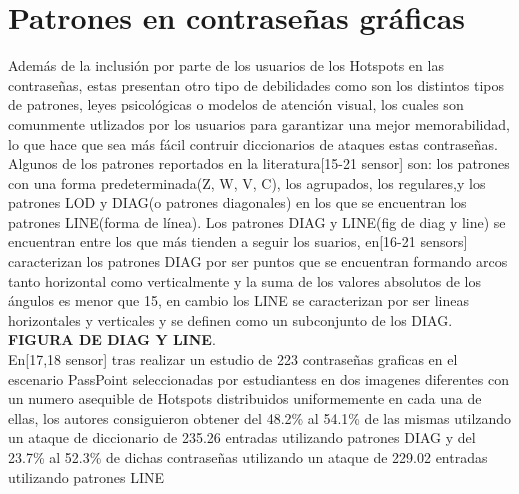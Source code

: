 \documentclass[12pt]{report}
\begin{document}
\section{Patrones en contraseñas gráficas}
Además de la inclusión por parte de los usuarios de los Hotspots en las contraseñas, estas presentan otro tipo de debilidades como son los distintos tipos de patrones, leyes psicológicas o modelos de atención visual, los cuales son comunmente utlizados por los usuarios para garantizar una mejor memorabilidad, lo que hace que sea más fácil contruir diccionarios de ataques estas contraseñas.
Algunos de los patrones reportados en la literatura[15-21 sensor] son: los patrones con una forma predeterminada(Z, W, V, C), los agrupados,  los regulares,y los patrones LOD y DIAG(o patrones diagonales) en los que se encuentran los patrones LINE(forma de línea). 
Los patrones DIAG y LINE(fig de diag y line) se encuentran entre los que más tienden a seguir los suarios, en[16-21 sensors] caracterizan los patrones DIAG  por ser puntos que se encuentran formando arcos tanto horizontal como verticalmente y la suma de los valores absolutos de los ángulos es menor que 15, en cambio los LINE se caracterizan por ser lineas horizontales y verticales y se definen como un subconjunto de los DIAG. 
\textbf{FIGURA DE DIAG Y LINE}.
\\
En[17,18 sensor] tras realizar un estudio de 223 contraseñas graficas en el escenario PassPoint seleccionadas por estudiantess en dos imagenes diferentes con un numero asequible de Hotspots distribuidos uniformemente en cada una de ellas, los autores consiguieron obtener del 48.2\% al 54.1\% de las mismas utilzando un ataque de diccionario de 235.26 entradas utilizando patrones  DIAG y del 23.7\% al 52.3\% de dichas contraseñas utilizando un ataque de 229.02 entradas utilizando  patrones LINE 
\end{document}
